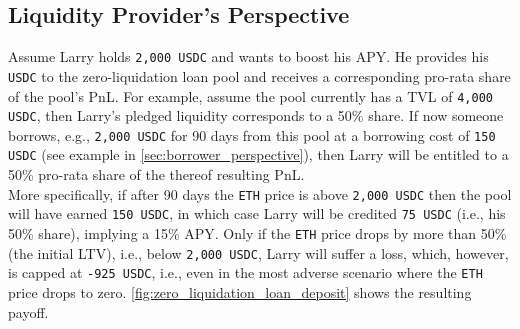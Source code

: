 \documentclass[a4paper]{article}
\begin{document}
\subsection{Liquidity Provider's Perspective}
Assume Larry holds \verb|2,000 USDC| and wants to boost his APY. He provides his \verb|USDC| to the zero-liquidation loan pool and receives a corresponding pro-rata share of the pool's PnL. For example, assume the pool currently has a TVL of \verb|4,000 USDC|, then Larry's pledged liquidity corresponds to a 50\% share. If now someone borrows, e.g., \verb|2,000 USDC| for 90 days from this pool at a borrowing cost of \verb|150 USDC| (see example in \cref{sec:borrower_perspective}), then Larry will be entitled to a 50\% pro-rata share of the thereof resulting PnL.\\

More specifically, if after 90 days the \verb|ETH| price is above \verb|2,000 USDC| then the pool will have earned \verb|150 USDC|, in which case Larry will be credited \verb|75 USDC| (i.e., his 50\% share), implying a 15\% APY. Only if the \verb|ETH| price drops by more than 50\% (the initial LTV), i.e., below \verb|2,000 USDC|, Larry will suffer a loss, which, however, is capped at \verb|-925 USDC|, i.e., even in the most adverse scenario where the \verb|ETH| price drops to zero. \cref{fig:zero_liquidation_loan_deposit} shows the resulting payoff.
\end{document}

